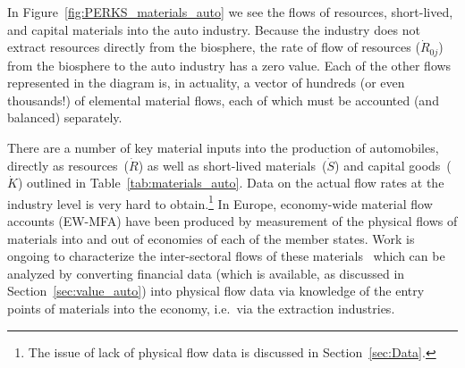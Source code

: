 In Figure~\ref{fig:PERKS_materials_auto}
we see the flows of resources,
short-lived, and capital materials
into the auto industry.
Because the industry does not
extract resources directly from the biosphere,
the rate of flow of resources ($\dot{R}_{0j}$) 
from the biosphere to the auto industry 
has a zero value.
Each of the other flows represented in the diagram is,
in actuality,
a vector of hundreds (or even thousands!)
of elemental material flows,
each of which must be accounted 
(and balanced) separately.

There are a number of key material inputs into the
production of automobiles, directly as 
resources~($\dot{R}$) as well as short-lived 
materials~($\dot{S}$) and capital goods~($\dot{K}$)
outlined in Table~\ref{tab:materials_auto}. 
Data on the actual flow rates %
at the industry level
is very hard to obtain.\footnote{The issue of 
lack of physical flow data is discussed in 
Section~\ref{sec:Data}.
}
In Europe,
economy-wide material flow accounts (EW-MFA)
have been produced by measurement of the physical flows
of materials into and out of economies of 
each of the member states.\cite{EUROSTAT2011} 
Work is ongoing to characterize the inter-sectoral
flows of these materials~\cite{ConAccount1998}
which can be analyzed by converting financial data 
(which is available, as discussed in 
Section~\ref{sec:value_auto}) into physical flow data
via knowledge of the entry points of materials into the economy,
i.e.\ via the extraction industries.

